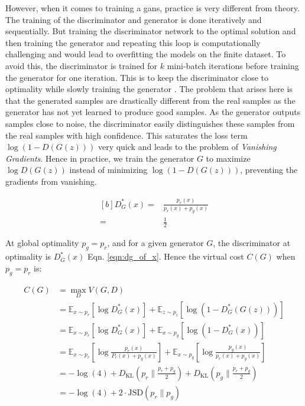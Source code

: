However, when it comes to training a \acp{gan}, practice is very different from theory. The training of the discriminator and generator is done iteratively and sequentially. But training the discriminator network to the optimal solution and then training the generator and repeating this loop is computationally challenging and would lead to overfitting the models on the finite dataset. To avoid this, the discriminator is trained for $k$ mini-batch iterations before training the generator for one iteration. This is to keep the discriminator close to optimality while slowly training the generator \cite{goodfellow2014generative}. The problem that arises here is that the generated samples are drastically different from the real samples as the generator has not yet learned to produce good samples. As the generator outputs samples close to noise, the discriminator easily distinguishes these samples from the real samples with high confidence. This saturates the loss term $\log (1-D(G(z)))$ very quick and leads to the problem of \textit{Vanishing Gradients}. Hence in practice, we train the generator $G$ to maximize $\log D(G(z))$ instead of minimizing $\log (1-D(G(z)))$, preventing the gradients from vanishing.

\begin{equation} \label{eqn:dg_of_x}
    \begin{aligned}[b]
        D_{G}^*(x) = & \frac{p_{r}(x)}{p_{r}(x)+p_{g}(x)} \\
        =            & \frac{1}{2}
    \end{aligned}
\end{equation}

At global optimality $p_{g}=p_{r}$, and for a given generator $G$, the discriminator at optimality is $D_{G}^*(x)$ Eqn. \ref{eqn:dg_of_x}. Hence the virtual cost $C(G)$ \cite{goodfellow2014generative} when $p_{g}=p_{r}$ is:

\begin{equation} \label{eqn:c_of_g}
    \begin{aligned}
        C(G) & = \max _{D} V(G, D)                                                                                                                                          \\
             & =\mathbb{E}_{x \sim p_{r}}\left[\log D_{G}^{*}(x)\right]+\mathbb{E}_{z \sim p_{z}}\left[\log \left(1-D_{G}^{*}(G(z))\right)\right]                           \\
             & =\mathbb{E}_{x \sim p_{r}}\left[\log D_{G}^{*}(x)\right]+\mathbb{E}_{x \sim p_{g}}\left[\log \left(1-D_{G}^{*}(x)\right)\right]                              \\
             & =\mathbb{E}_{x \sim p_{r}}\left[\log \frac{p_{r}(x)}{P_{r}(x)+p_{g}(x)}\right]+\mathbb{E}_{x \sim p_{g}}\left[\log \frac{p_{g}(x)}{p_{r}(x)+p_{g}(x)}\right] \\
             & =-\log (4)+ D_{\mathrm{KL}}\left(p_{r} \| \frac{p_{r}+p_{g}}{2}\right)+D_{\mathrm{KL}}\left(p_{g} \| \frac{p_{r}+p_{g}}{2}\right)                            \\
             & =-\log(4) + 2 \cdot  \mathrm{JSD}(p_{r} \| p_{g})
    \end{aligned}
\end{equation}

